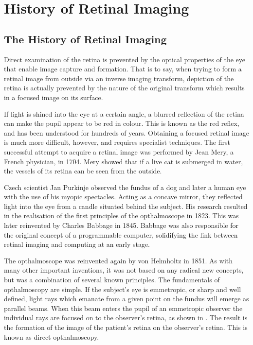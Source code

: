 
\chapter{History of Retinal Imaging}

\label{history_retinal_imaging}


\section{The History of Retinal Imaging}


Direct examination of the retina is prevented by the optical properties of the eye that enable image capture and formation.  That is to say, when trying to form a retinal image from outside via an inverse imaging transform, depiction of the retina is actually prevented by the nature of the original transform which results in a focused image on its surface.

If light is shined into the eye at a certain angle, a blurred reflection of the retina can make the pupil appear to be red in colour.  This is known as the red reflex, and has been understood for hundreds of years.  Obtaining a focused retinal image is much more difficult, however, and requires specialist techniques.  The first successful attempt to acquire a retinal image was performed by Jean Mery, a French physician, in 1704.  Mery  showed that if a live cat is submerged in water, the vessels of its retina can be seen from the outside.\cite{collegeoptometrists}

Czech scientist Jan Purkinje observed the fundus of a dog and later a human eye with the use of his myopic spectacles.  Acting as a concave mirror, they reflected light into the eye from a candle situated behind the subject.  His research resulted in the realisation of the first principles of the opthalmoscope in 1823.  This was later reinvented by Charles Babbage in 1845.\cite{flick1947centenary,keeler1997150}  Babbage was also responsible for the original concept of a programmable computer, solidifying the link between retinal imaging and computing at an early stage.\cite{halacy1970charles}

The opthalmoscope was reinvented again by von Helmholtz in 1851.  As with many other important inventions, it was not based on any radical new concepts, but was a combination of several known principles.  The fundamentals of opthalmoscopy are simple.  If the subject's eye is emmetropic, or sharp and well defined, light rays which emanate from a given point on the fundus will emerge as parallel beams.  When this beam enters the pupil of an emmetropic observer the individual rays are focused on to the observer's retina, as shown in .  The result is the formation of the image of the patient's retina on the observer's retina.  This is known as direct opthalmoscopy.

